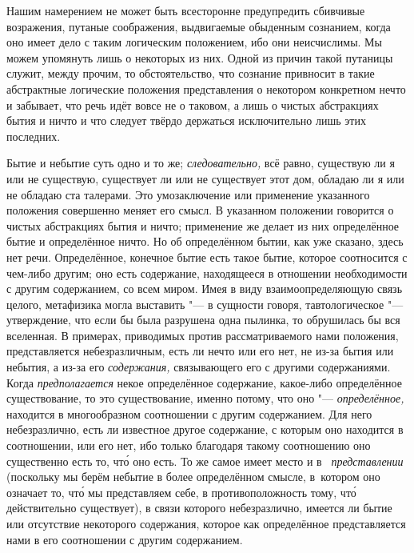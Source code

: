 Нашим намерением не может быть всесторонне предупредить сбивчивые возражения,
путаные соображения, выдвигаемые обыденным сознанием, когда оно имеет дело с
таким логическим положением, ибо они неисчислимы. Мы можем упомянуть лишь о
некоторых из них. Одной из причин такой путаницы служит, между прочим, то
обстоятельство, что сознание привносит в такие абстрактные логические положения
представления о некотором конкретном нечто и забывает, что речь идёт вовсе не о
таковом, а лишь о чистых абстракциях бытия и ничто и что следует твёрдо
держаться исключительно лишь этих последних.

Бытие и небытие суть одно и то же; {\em следовательно,} всё равно, существую ли
я или не существую, существует ли или не существует этот дом, обладаю ли я или
не обладаю ста талерами. Это умозаключение или применение указанного положения
совершенно меняет его смысл. В указанном положении говорится о чистых
абстракциях бытия и ничто; применение же делает из них определённое бытие и
определённое ничто. Но об определённом бытии, как уже сказано, здесь нет речи.
Определённое, конечное бытие есть такое бытие, которое соотносится с чем-либо
другим; оно есть содержание, находящееся в отношении необходимости с другим
содержанием, со всем миром. Имея в виду взаимоопределяющую связь целого,
метафизика могла выставить "--- в сущности говоря, тавтологическое "---
утверждение, что если бы была разрушена одна пылинка, то обрушилась бы вся
вселенная. В примерах, приводимых против рассматриваемого нами положения,
представляется небезразличным, есть ли нечто или его нет, не из-за бытия или
небытия, а из-за его {\em содержания,} связывающего его с другими содержаниями.
Когда {\em предполагается} некое определённое содержание, какое-либо
определённое существование, то это существование, именно потому, что оно "---
{\em определённое,} находится в многообразном соотношении с другим содержанием.
Для него небезразлично, есть ли известное другое содержание, с которым оно
находится в соотношении, или его нет, ибо только благодаря такому соотношению
оно существенно есть то, чт\'{о} оно есть. То же самое имеет место и в~{\em
представлении} (поскольку мы берём небытие в более определённом смысле,
в~котором оно означает то, чт\'{о} мы представляем себе, в противоположность
тому, чт\'{о} действительно существует), в связи которого небезразлично,
имеется ли бытие или отсутствие некоторого содержания, которое как определённое
представляется нами в его соотношении с другим содержанием. \label{bkm:bm85a}

